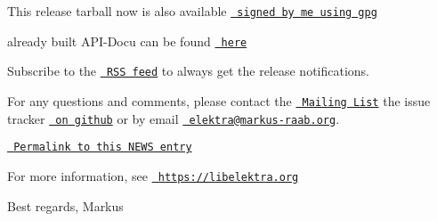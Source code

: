 This release tarball now is also available \href{https://www.libelektra.org/ftp/elektra/releases/elektra-0.8.19.tar.gz.gpg}{\texttt{ signed by me using gpg}}

already built A\+P\+I-\/\+Docu can be found \href{https://doc.libelektra.org/api/0.8.19/html/}{\texttt{ here}}

Subscribe to the \href{https://doc.libelektra.org/news/feed.rss}{\texttt{ R\+SS feed}} to always get the release notifications.

For any questions and comments, please contact the \href{https://lists.sourceforge.net/lists/listinfo/registry-list}{\texttt{ Mailing List}} the issue tracker \href{https://git.libelektra.org/issues}{\texttt{ on github}} or by email \href{mailto:elektra@markus-raab.org}{\texttt{ elektra@markus-\/raab.\+org}}.

\href{https://doc.libelektra.org/news/8e05231a-4f3d-488b-8dc2-5f0d5c474c39.html}{\texttt{ Permalink to this N\+E\+WS entry}}

For more information, see \href{https://libelektra.org}{\texttt{ https\+://libelektra.\+org}}

Best regards, Markus 